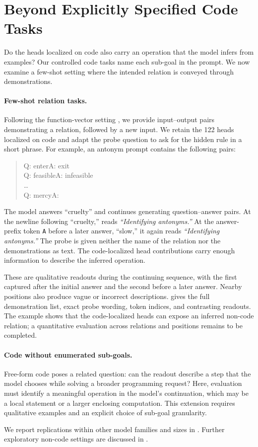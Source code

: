 \section{Beyond Explicitly Specified Code Tasks}
\label{sec:generalization}
\label{sec:steer:noncode}
Do the heads localized on code also carry an operation that the model infers from examples? Our controlled code tasks name each sub-goal in the prompt. We now examine a few-shot setting where the intended relation is conveyed through demonstrations.

\paragraph{Few-shot relation tasks.}
Following the function-vector setting \citep{todd2024function}, we provide input--output pairs demonstrating a relation, followed by a new input. We retain the 122 heads localized on code and adapt the probe question to ask for the hidden rule in a short phrase. For example, an antonym prompt contains the following pairs:

\begin{quote}\small\ttfamily
Q: enter\quad A: exit\\
Q: feasible\quad A: infeasible\\
\ldots\\
Q: mercy\quad A:
\end{quote}
The model answers ``cruelty'' and continues generating question--answer pairs. At the newline following ``cruelty,'' \goalscope reads \emph{``Identifying antonyms.''} At the answer-prefix token \texttt{A} before a later answer, ``slow,'' it again reads \emph{``Identifying antonyms.''} The probe is given neither the name of the relation nor the demonstrations as text. The code-localized head contributions carry enough information to describe the inferred operation.

These are qualitative readouts during the continuing sequence, with the first captured after the initial answer and the second before a later answer. Nearby positions also produce vague or incorrect descriptions.  gives the full demonstration list, exact probe wording, token indices, and contrasting readouts. The example shows that the code-localized heads can expose an inferred non-code relation; a quantitative evaluation across relations and positions remains to be completed.

\paragraph{Code without enumerated sub-goals.}
Free-form code poses a related question: can the readout describe a step that the model chooses while solving a broader programming request? Here, evaluation must identify a meaningful operation in the model's continuation, which may be a local statement or a larger enclosing computation. This extension requires qualitative examples and an explicit choice of sub-goal granularity.

We report replications within other model families and sizes in . Further exploratory non-code settings are discussed in .

